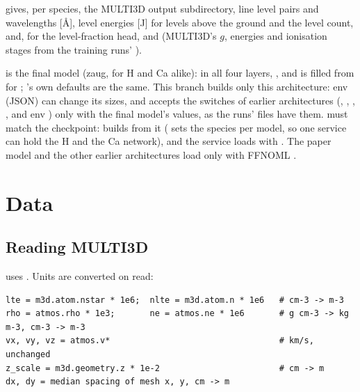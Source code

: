  gives, per species, the MULTI3D output subdirectory, line level pairs and wavelengths [\AA], level energies  [J] for levels above the ground and the level count, and, for the level-fraction head,  and  (MULTI3D's $g$, energies and ionisation stages from the training runs' ).

 is the final model (zaug, for H and Ca alike):  in all four layers, , and  is filled from  for ; 's own defaults are the same. This branch builds only this architecture: env  (JSON) can change its sizes, and accepts the switches of earlier architectures (, , , , and env ) only with the final model's values, as the runs'  files have them.  must match the checkpoint:  builds from it ( sets the species per model, so one service can hold the H and the Ca network), and the service loads with . The paper model and the other earlier architectures load only with FFNOML .

\section{Data}

\subsection{Reading MULTI3D}
 uses . Units are converted on read:

\begin{lstlisting}
lte = m3d.atom.nstar * 1e6;  nlte = m3d.atom.n * 1e6   # cm-3 -> m-3
rho = atmos.rho * 1e3;       ne = atmos.ne * 1e6       # g cm-3 -> kg m-3, cm-3 -> m-3
vx, vy, vz = atmos.v*                                  # km/s, unchanged
z_scale = m3d.geometry.z * 1e-2                        # cm -> m
dx, dy = median spacing of mesh x, y, cm -> m
\end{lstlisting}

